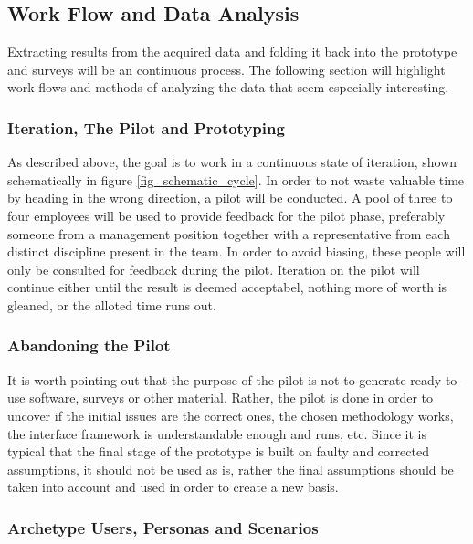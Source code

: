 \documentclass[10pt]{article}
\begin{document}
  \subsection{Work Flow and Data Analysis}

    Extracting results from the acquired data and folding it back into the
    prototype and surveys will be an continuous process. The following section
    will highlight work flows and methods of analyzing the data that seem
    especially interesting.

    \subsubsection{Iteration, The Pilot and Prototyping}

      As described above, the goal is to work in a continuous state of iteration,
      shown schematically in figure \ref{fig_schematic_cycle}. In order to not
      waste valuable time by heading in the wrong direction, a pilot will be
      conducted. A pool of three to four employees will be used to provide
      feedback for the pilot phase, preferably someone from a management
      position together with a representative from each distinct discipline
      present in the team. In order to avoid biasing, these people will only be
      consulted for feedback during the pilot. Iteration on the pilot will
      continue either until the result is deemed acceptabel, nothing more of
      worth is gleaned, or the alloted time runs out.

    \subsubsection{Abandoning the Pilot}

      It is worth pointing out that the purpose of the pilot is not to generate
      ready-to-use software, surveys or other material. Rather, the pilot is
      done in order to uncover if the initial issues are the correct ones, the
      chosen methodology works, the interface framework is understandable
      enough and runs, etc. Since it is typical that the final stage of the
      prototype is built on faulty and corrected assumptions, it should not be
      used as is, rather the final assumptions should be taken into account and
      used in order to create a new basis.

    \subsubsection{Archetype Users, Personas and Scenarios}
\end{document}
